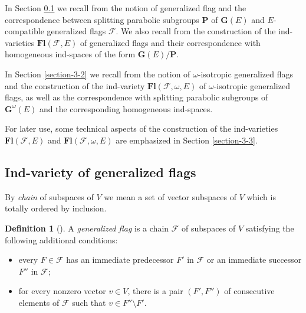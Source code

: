\documentclass[12pt]{amsart}
\theoremstyle{definition}
\newtheorem{definition}{Definition}
\begin{document}
\label{section-3}

In Section \ref{section-3-1}
we recall from \cite{DP1, DP} the notion of generalized flag and the correspondence between splitting parabolic subgroups $\mathbf{P}$ of $\mathbf{G}(E)$ and $E$-compatible generalized flags $\mathcal{F}$.  We also recall from \cite{DP} the construction of the ind-varieties $\mathbf{Fl}(\mathcal{F},E)$ of generalized flags and their correspondence with homogeneous ind-spaces of the form $\mathbf{G}(E)/\mathbf{P}$.

In Section \ref{section-3-2} we recall from \cite{DP1, DP} the notion of $\omega$-isotropic generalized flags and the construction of the ind-variety $\mathbf{Fl}(\mathcal{F},\omega,E)$ of $\omega$-isotropic generalized flags, as well as the correspondence with splitting parabolic subgroups of $\mathbf{G}^\omega(E)$ and the corresponding homogeneous ind-spaces.

For later use, some technical aspects of the construction of the ind-varieties $\mathbf{Fl}(\mathcal{F},E)$ and $\mathbf{Fl}(\mathcal{F},\omega,E)$ are emphasized in Section \ref{section-3-3}.


\subsection{Ind-variety of generalized flags}

\label{section-3-1}

By {\em chain} of subspaces of $V$ we mean a set of vector subspaces of $V$ which is totally ordered by inclusion.

\begin{definition}[\cite{DP1,DP}]
\label{definition-1}
A {\em generalized flag} is a chain $\mathcal{F}$ of subspaces of $V$ satisfying the following additional conditions:
\begin{itemize}
\item[{\rm (i)}] every $F\in\mathcal{F}$ has an immediate predecessor $F'$ in $\mathcal{F}$ or an immediate successor $F''$ in $\mathcal{F}$;
\item[{\rm (ii)}] for every nonzero vector $v\in V$, there is a pair $(F',F'')$ of consecutive elements of $\mathcal{F}$ such that $v\in F''\setminus F'$.\end{itemize}
\end{definition}
\end{document}
